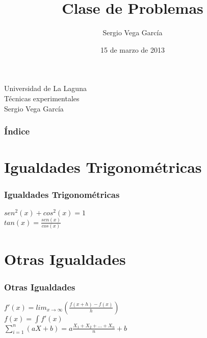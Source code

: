 \documentclass{beamer}
\title[Presentación con Beamer]{Clase de Problemas }
\author[Sergio Vega García]{Sergio Vega García}
\date[15-03-2013]{15 de marzo de 2013}
\begin{document}

    \begin{frame}
        \begin{scriptsize}
            \begin{center}
                Universidad de La Laguna\cite{ULL}\\
                Técnicas experimentales\cite{TE} \\
                Sergio Vega García
             \end{center}
         \end{scriptsize}
    \end{frame}

    
    \begin{frame}
       \frametitle{Índice}  
       \tableofcontents[pausesections]
    \end{frame}

    
\section{Igualdades Trigonométricas}

 \begin{frame}

 \frametitle{Igualdades Trigonométricas}

\begin{center}
  
   $sen^2(x) + cos^2(x) = 1$\\   
   \vspace{1.5cm}
   $tan(x) = \frac{sen(x)}{cos(x)}$
   
  
\end{center}

 

\end{frame}


\section{Otras Igualdades}

\begin{frame}
 
 \frametitle{Otras Igualdades}
 
\begin{center}
 
 $f'(x)= lim_{x\to\infty}(\frac{f(x+h)-f(x)}{h})$\\
 \vspace{0.75cm}
 $f(x)= \int f'(x)$\\
 \vspace{0.75cm}
 $\sum_{i=1}^{n}(aX+b) = a\frac{X_1 + X_2 + ... + X_n}{n} + b$
 
\end{center} 
 
\end{frame}
\end{document}
